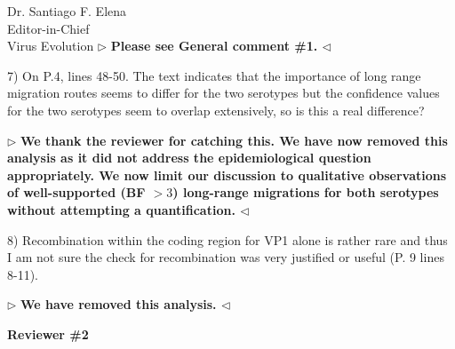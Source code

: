 \documentclass[12pt, a4paper]{letter} %
\newenvironment{reply}{$\triangleright$\bf}{$\triangleleft$}
\begin{document}
\begin{letter}{
	Dr. Santiago F. Elena\\
    Editor-in-Chief \\
    Virus Evolution
}
\begin{reply}
Please see General comment \#1.
\end{reply}

7)      On P.4, lines 48-50. The text indicates that the importance of long range migration routes seems to differ for the two serotypes but the confidence values for the two serotypes seem to overlap extensively, so is this a real difference?

\begin{reply}
We thank the reviewer for catching this.
We have now removed this analysis as it did not address the epidemiological question appropriately.
We now limit our discussion to qualitative observations of well-supported (BF $>3$) long-range migrations for both serotypes without attempting a quantification. 
\end{reply}

8)      Recombination within the coding region for VP1 alone is rather rare and thus I am not sure the check for recombination was very justified or useful (P. 9 lines 8-11).

\begin{reply}
We have removed this analysis.
\end{reply}


\textbf{Reviewer \#2}


\end{letter}
\end{document}
